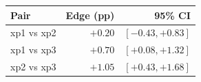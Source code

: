 \begin{tabular}{lrr}
\toprule
Pair & Edge (pp) & 95\% CI \\
\midrule
xp1 vs xp2 & $+0.20$ & $[-0.43, +0.83]$ \\
xp1 vs xp3 & $+0.70$ & $[+0.08, +1.32]$ \\
xp2 vs xp3 & $+1.05$ & $[+0.43, +1.68]$ \\
\bottomrule
\end{tabular}
